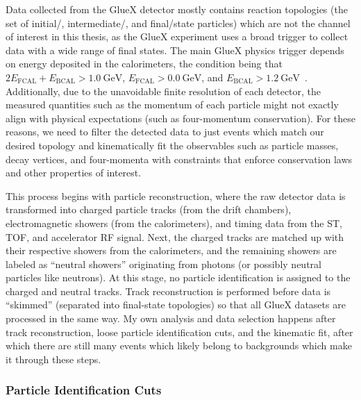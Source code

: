Data collected from the GlueX detector mostly contains reaction topologies (the set of initial\-/, intermediate\-/, and final\-/state particles) which are not the channel of interest in this thesis, as the GlueX experiment uses a broad trigger to collect data with a wide range of final states. The main GlueX physics trigger depends on energy deposited in the calorimeters, the condition being that $2E_{\text{FCAL}}+E_{\text{BCAL}} > \SI{1.0}{\giga\electronvolt}$, $E_{\text{FCAL}} > \SI{0.0}{\giga\electronvolt}$, and $E_{\text{BCAL}} > \SI{1.2}{\giga\electronvolt}$~\cite{Adhikari2021}. Additionally, due to the unavoidable finite resolution of each detector, the measured quantities such as the momentum of each particle might not exactly align with physical expectations (such as four-momentum conservation). For these reasons, we need to filter the detected data to just events which match our desired topology and kinematically fit the observables such as particle masses, decay vertices, and four-momenta with constraints that enforce conservation laws and other properties of interest.

This process begins with particle reconstruction, where the raw detector data is transformed into charged particle tracks (from the drift chambers), electromagnetic showers (from the calorimeters), and timing data from the ST, TOF, and accelerator RF signal. Next, the charged tracks are matched up with their respective showers from the calorimeters, and the remaining showers are labeled as ``neutral showers'' originating from photons (or possibly neutral particles like neutrons). At this stage, no particle identification is assigned to the charged and neutral tracks. Track reconstruction is performed before data is ``skimmed'' (separated into final-state topologies) so that all GlueX datasets are processed in the same way. My own analysis and data selection happens after track reconstruction, loose particle identification cuts, and the kinematic fit, after which there are still many events which likely belong to backgrounds which make it through these steps.

\subsubsection{Particle Identification Cuts}

